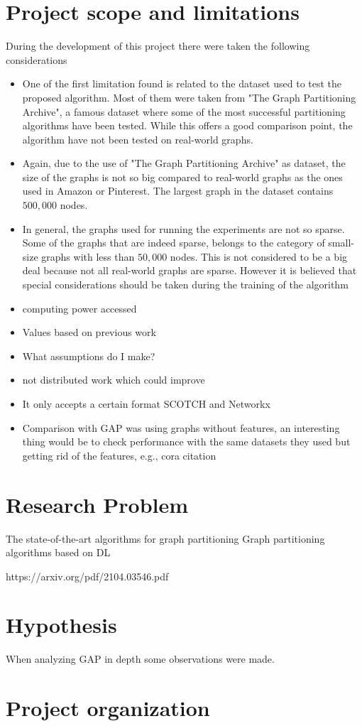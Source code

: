 \section{Project scope and limitations}
During the development of this project there were taken the following considerations
\begin{itemize}
    \item One of the first limitation found is related to the dataset used to test the proposed algorithm. Most of them were taken from "The Graph Partitioning Archive", a famous dataset where some of the most successful partitioning algorithms have been tested. While this offers a good comparison point, the algorithm have not been tested on real-world graphs.
    \item Again, due to the use of "The Graph Partitioning Archive" as dataset, the size of the graphs is not so big compared to real-world graphs as the ones used in Amazon or Pinterest. The largest graph in the dataset contains $500,000$ nodes.
    \item In general, the graphs used for running the experiments are not so sparse. Some of the graphs that are indeed sparse, belongs to the category of small-size graphs with less than $50,000$ nodes. This is not considered to be a big deal because not all real-world graphs are sparse. However it is believed that special considerations should be taken during the training of the algorithm
    \item computing power accessed 
    \item Values based on previous work
    \item What assumptions do I make?
    \item not distributed work which could improve
    \item It only accepts a certain format SCOTCH and Networkx
    \item Comparison with GAP was using graphs without features, an interesting thing would be to check performance with the same datasets they used but getting rid of the features, e.g., cora citation
\end{itemize}

\section{Research Problem}
The state-of-the-art algorithms for graph partitioning 
Graph partitioning algorithms based on DL

https://arxiv.org/pdf/2104.03546.pdf
\section{Hypothesis}
When analyzing GAP in depth some observations were made.

\section{Project organization}

